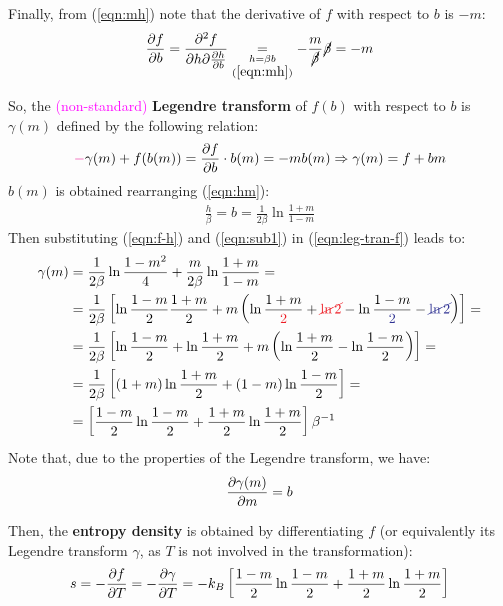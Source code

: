 \documentclass[../template.tex]{subfiles}
\begin{document}
\begin{example}
    \medskip

    Finally, from (\ref{eqn:mh}) note that the derivative of $f$ with respect to $b$ is $-m$:
    \begin{align*}
        \pdv{f}{b} = \pdv{f}{h} {\pdv{h}{b}} \underset{\substack{h = \beta b\\(\ref{eqn:mh})}}{=} -\frac{m}{\cancel{\beta}} \cancel{\beta} = -m
    \end{align*}

    So, the \textcolor{Magenta}{(non-standard)} \textbf{Legendre transform} of $f(b)$ with respect to $b$ is $\gamma(m)$ defined by the following relation:
    \begin{align}\label{eqn:leg-tran-f}
        \textcolor{Magenta}{-} \gamma(m) + f(b(m)) = {\pdv{f}{b}}  \cdot b(m) = -mb(m) \Rightarrow \gamma(m) = f+ bm
    \end{align} 
    $b(m)$ is obtained rearranging (\ref{eqn:hm}):
    \begin{align}\label{eqn:sub1}
        \frac{h}{\beta} = b = \frac{1}{2\beta} \ln \frac{1+m}{1-m}   
    \end{align}
    Then substituting (\ref{eqn:f-h}) and (\ref{eqn:sub1}) in (\ref{eqn:leg-tran-f}) leads to:
    \begin{align*}
        \gamma(m) &= \frac{1}{2 \beta} \ln \frac{1-m^2}{4} + \frac{m}{2\beta}\ln \frac{1+m}{1-m} =\\
        &=\frac{1}{2\beta} \left[\ln \frac{1-m}{2} \frac{1+m}{2} + m\left(\ln \frac{1+m}{\textcolor{Red}{2}} +\textcolor{Red}{\cancel{\ln 2}} - \ln\frac{1-m}{\textcolor{Blue}{2}} -\textcolor{Blue}{\cancel{\ln 2}}   \right)    \right] =\\
        &= \frac{1}{2\beta} \left[\ln \frac{1-m}{2} + \ln \frac{1+m}{2} + m\left(\ln \frac{1+m}{2} - \ln \frac{1-m}{2}  \right)\right] =\\
        &= \frac{1}{2\beta} \left[(1+m)\ln\frac{1+m}{2} +(1-m) \ln \frac{1-m}{2}  \right] =\\
        &= \left[\frac{1-m}{2} \ln \frac{1-m}{2} +\frac{1+m}{2}\ln \frac{1+m}{2}    \right] \beta^{-1}
    \end{align*} 
    Note that, due to the properties of the Legendre transform, we have:
    \begin{align*}
        \pdv{\gamma(m)}{m} = b
    \end{align*}

    Then, the \textbf{entropy density} is obtained by differentiating $f$ (or equivalently its Legendre transform $\gamma$, as $T$ is not involved in the transformation):
    \begin{align}\label{eqn:s-density}
        s = -\pdv{f}{T} = -\pdv{\gamma}{T} = -k_B \left[\frac{1-m}{2} \ln \frac{1-m}{2} + \frac{1+m}{2} \ln \frac{1+m}{2} \right]
    \end{align} 


\end{example}
\end{document}
